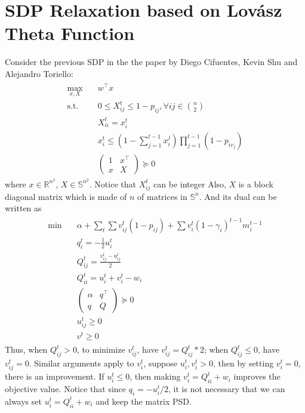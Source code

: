\documentclass[10pt,leqno]{amsart}
\newcommand{\R}{\mathbb{R}}
\newcommand{\symm}{\mathbb{S}}
\renewcommand{\symm}{\mathbb{S}}
\begin{document}
\section{SDP Relaxation based on Lov\'asz Theta Function}
Consider the previous SDP in the the paper by Diego Cifuentes, Kevin Shu and Alejandro Toriello:
\begin{align}
  \label{SDP-P'}
  \tag{SDP-P'}
  \begin{split}
    \max_{x,X}\quad &w^\top x\\
    \text{s.t.}\quad &0\leq X^t_{ij}\leq 1-p_{ij},\forall ij\in{n\choose{2}}\\
    &X^t_{ii}=x_i^t\\
    &x_i^t\leq (1-\sum_{j=1}^{t-1}x_i^j)\prod_{j=1}^{t-1}(1-p_{iv_j})\\
    &
    \begin{pmatrix}
      1&x^\top\\
      x&X
    \end{pmatrix}\succeq 0
  \end{split}
\end{align}
where $x\in\R^{n^2}$, $X\in\symm^{n^2}$.
Notice that $X_{ij}^t$ can be integer
Also, $X$ is a block diagonal matrix which is made of $n$ of matrices in $\symm^{n}$.
And its dual can be written as
\begin{align}
  \tag{SDP-D'}
  \begin{split}
    \min\quad &\alpha+\sum_t\sum v_{ij}^t(1-p_{ij})+\sum v^t_i(1-\gamma_i)^{t-1}m_i^{t-1}\\
    &q^t_i=-\frac{1}{2}u_i^t\\
    &Q^t_{ij}=\frac{v_{ij}^t-u_{ij}^t  }{2}\\
    &Q^t_{ii}=u_{i}^t+v_i^t-w_i\\
    &
    \begin{pmatrix}
      \alpha&q^\top\\
      q&Q
    \end{pmatrix}\succeq 0\\
    &u_{ij}^t\geq0\\
    &v^t\geq 0
  \end{split}
\end{align}
Thus, when $Q_{ij}^t>0$, to minimize $v_{ij}^t$, have $v_{ij}^t=Q_{ij}^t*2$; when $Q_{ij}^t\leq 0$, have $v_{ij}^t=0$.
Similar arguments apply to $v_i^t$, suppose $u_{i}^t, v_i^t>0$, then by setting $v_i^t=0$, there is an improvement. If $u_i^t\leq 0$, then making $v_i^t=Q_{ii}^t+w_i$ improves the objective value. Notice that since $q_i=-u_i^t/2 $, it is not necessary that we can always set $u_i^t=Q_{ii}^t+w_i$ and keep the matrix PSD.
\end{document}
